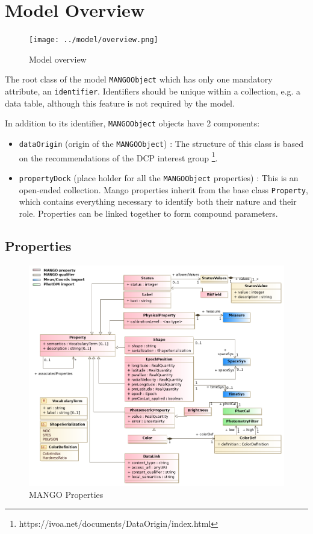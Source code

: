 \documentclass[11pt,a4paper]{ivoa}
\begin{document}
\section{Model Overview}

\begin{figure}
     \texttt{[image: ../model/overview.png]}
     \caption{Model overview}
     \label{overview}
\end{figure}


The root class of the model \texttt{MANGOObject} which has only
one mandatory attribute, an \texttt{identifier}.
Identifiers should be unique within a collection, e.g. a data table, although 
this feature is not required by the model.

In addition to its identifier, \texttt{MANGOObject} objects have 2 components:

\begin{itemize}[noitemsep,topsep=0pt,parsep=0pt,partopsep=0pt]

  \item \texttt{dataOrigin} (origin of the \texttt{MANGOObject}) : The structure of this class is based on
        the recommendations of the DCP interest group \footnote{https://ivoa.net/documents/DataOrigin/index.html}.
  \item \texttt{propertyDock} (place holder for all the \texttt{MANGOObject} properties) :
        This is an open-ended collection.
        Mango properties inherit from the base class \texttt{Property},
        which contains everything necessary to identify both their nature and their role.
        Properties can be linked together to form compound parameters.
\end{itemize}


\subsection{Properties}

      \begin{figure}[h]
        \includegraphics[width=1.0\textwidth]{../model/property.png}
        \caption{MANGO Properties}
        \label{fig:property}
      \end{figure}
\end{document}
